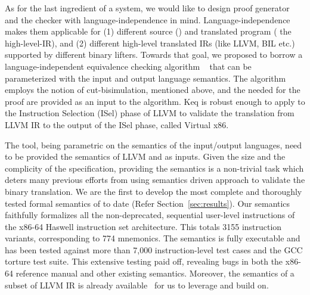 As for the last ingredient of a \TV system, we would like to design proof
generator and the checker with language-independence in mind.
Language-independence makes them applicable for (1) different source (\ISA) and
translated program ( the high-level-IR), and (2) different high-level translated
IRs (like LLVM, BIL etc.) supported by different binary lifters.  Towards that
goal, we proposed to borrow a language-independent equivalence checking
algorithm ~\cite{TheoSAS19} that can be parameterized with the input and output
language semantics. The algorithm employs the notion of cut-bisimulation,
         mentioned above, and the \syncp  needed for the proof are
         provided  as an input to the algorithm. Keq is robust enough to apply to the Instruction Selection (ISel) phase of LLVM to validate the translation from LLVM IR to the output of the ISel phase, called Virtual x86. 
  
 The  tool, being parametric on the semantics of the input/output languages, need to be provided the semantics of LLVM and \ISA as inputs. Given the size and the complicity of the \ISA specification, providing the \ISA semantics is a non-trivial task which deters many previous efforts from using semantics driven approach to validate the binary translation. We are the first to develop 
 the most complete and thoroughly tested formal
 semantics of \ISA to date (Refer Section~\ref{sec:results}). Our semantics faithfully formalizes all the non-deprecated, sequential user-level instructions
 of the x86-64 Haswell instruction set architecture. This totals
 3155 instruction variants, corresponding to 774 mnemonics.
 The semantics is fully executable and has been tested against
 more than 7,000 instruction-level test cases and the GCC
 torture test suite. This extensive testing paid off, revealing
 bugs in both the x86-64 reference manual and other existing
 semantics.  Moreover, the semantics of a subset of
 LLVM IR is already available~\cite{LLVMSEMA} for us to leverage and build on.
%

